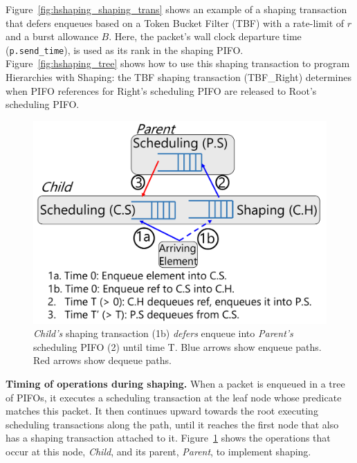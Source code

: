 

Figure~\ref{fig:hshaping_shaping_trans} shows an example of a shaping
transaction that defers enqueues based on a Token Bucket Filter (TBF)
with a rate-limit of $r$ and a burst allowance $B$. Here, the packet's
wall clock departure time ({\tt p.send\_time}), is used as its rank in
the shaping PIFO. Figure~\ref{fig:hshaping_tree} shows how to use this
shaping transaction to program Hierarchies with Shaping: the TBF
shaping transaction (TBF\_Right) determines when PIFO references for
Right's scheduling PIFO are released to Root's scheduling PIFO.

\begin{figure}[!t]
  \centering
  \includegraphics[width=0.6\columnwidth]{pifo_shaping_semantics.pdf}
  \caption{\textit{Child's} shaping transaction (1b) {\em defers} enqueue
  into \textit{Parent's} scheduling PIFO (2) until time T.  Blue arrows
  show enqueue paths. Red arrows show dequeue paths.  }
  \label{fig:shaping_trans}
\end{figure}

\medskip
\noindent
\textbf{Timing of operations during shaping.}
When a packet is enqueued in a tree of PIFOs, it executes a scheduling
transaction at the leaf node whose predicate matches this packet.  It
then continues upward towards the root executing scheduling
transactions along the path, until it reaches the first node that also
has a shaping transaction attached to
it. Figure~\ref{fig:shaping_trans} shows the operations that occur at
this node, {\em Child}, and its parent, {\em Parent}, to implement
shaping.

